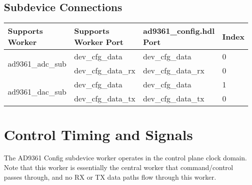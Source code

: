 \documentclass{article}
\def\comp{ad9361\_config}
\def\Comp{AD9361 Config}
\begin{document}
\begin{landscape}
  \section*{Subdevice Connections}
  \begin{scriptsize}
    \begin{tabular}{|p{5cm}|p{5cm}|p{5cm}|p{7.22cm}|}
      \hline
      \rowcolor{blue}
      Supports Worker  & Supports Worker Port & \comp{}.hdl Port   & Index \\
      \hline
      \multirow{2}{*}{ad9361\_adc\_sub} & dev\_cfg\_data       & dev\_cfg\_data     &0 \\
                       & dev\_cfg\_data\_rx   & dev\_cfg\_data\_rx &0 \\
      \hline
      \multirow{2}{*}{ad9361\_dac\_sub} & dev\_cfg\_data       & dev\_cfg\_data     &1 \\
                       & dev\_cfg\_data\_tx   & dev\_cfg\_data\_tx &0 \\
      \hline
    \end{tabular}
  \end{scriptsize}

\end{landscape}

\section*{Control Timing and Signals}
The \Comp{} subdevice worker operates in the control plane clock domain. Note that this worker is essentially the central worker that command/control passes through, and no RX or TX data paths flow through this worker.
\end{document}
